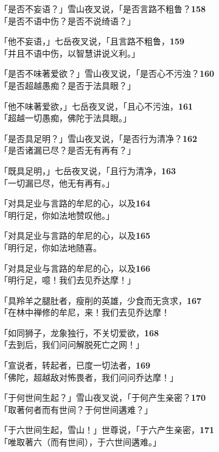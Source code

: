 「是否不妄语？」雪山夜叉说，「是否言路不粗鲁？\hfill{\grayfootnotesize \textbf{158}} \\
「是否不语中伤？是否不说绮语？」


「他不妄语，」七岳夜叉说，「且言路不粗鲁，\hfill{\grayfootnotesize \textbf{159}} \\
「并且不语中伤，以智慧讲说义利。」


「是否不味著爱欲？」雪山夜叉说，「是否心不污浊？\hfill{\grayfootnotesize \textbf{160}} \\
「是否超越愚痴？是否于法具眼？」


「他不味著爱欲，」七岳夜叉说，「且心不污浊，\hfill{\grayfootnotesize \textbf{161}} \\
「超越一切愚痴，佛陀于法具眼。」


「是否具足明？」雪山夜叉说，「是否行为清净？\hfill{\grayfootnotesize \textbf{162}} \\
「是否诸漏已尽？是否无有再有？」


「既具足明，」七岳夜叉说，「且行为清净，\hfill{\grayfootnotesize \textbf{163}} \\
「一切漏已尽，他无有再有。」


「对具足业与言路的牟尼的心，以及\hfill{\grayfootnotesize \textbf{164}} \\
「明行足，你如法地赞叹他。」


「对具足业与言路的牟尼的心，以及\hfill{\grayfootnotesize \textbf{165}} \\
「明行足，你如法地随喜。


「对具足业与言路的牟尼的心，以及\hfill{\grayfootnotesize \textbf{166}} \\
「明行足，噫！我们去见乔达摩！」


「具羚羊之腿肚者，瘦削的英雄，少食而无贪求，\hfill{\grayfootnotesize \textbf{167}} \\
「在林中禅修的牟尼，来！我们去见乔达摩！


「如同狮子，龙象独行，不关切爱欲，\hfill{\grayfootnotesize \textbf{168}} \\
「去到后，我们问问解脱死亡之网！」


「宣说者，转起者，已度一切法者，\hfill{\grayfootnotesize \textbf{169}} \\
「佛陀，超越敌对怖畏者，我们问问乔达摩！」


「于何世间生起？」雪山夜叉说，「于何产生亲密？\hfill{\grayfootnotesize \textbf{170}} \\
「取著何者而有世间？于何世间遘难？」


「于六世间生起，雪山！」世尊说，「于六产生亲密，\hfill{\grayfootnotesize \textbf{171}} \\
「唯取著六（而有世间），于六世间遘难。」


